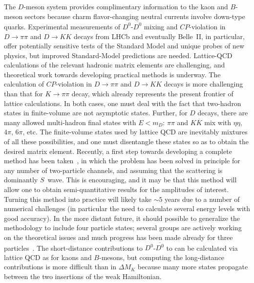 \begin{itemize}
The $D$-meson system provides complimentary information to the kaon and $B$-meson sectors because charm flavor-changing neutral currents involve down-type quarks.  Experimental measurements of $D^0$-$\overline{D^0}$ mixing and $CP$-violation in $D\to\pi\pi$ and $D\to KK$ decays from LHCb and eventually Belle~II, in particular, offer potentially sensitive tests of the Standard Model and unique probes of new physics, but improved Standard-Model predictions are needed.  Lattice-QCD calculations of the relevant hadronic matrix elements are challenging, and theoretical work towards developing practical methods is underway.  
The calculation of $CP$-violation in $D\to\pi\pi$ and $D\to KK$ decays is more challenging than that for $K\to\pi\pi$ decay, which already represents the present frontier of lattice calculations.  In both cases, one must deal with the fact that two-hadron
states in finite-volume are not asymptotic states.
Further, for $D$ decays, there are many allowed multi-hadron final states with $E< m_D$: $\pi\pi$ and
$K\overline{K}$ mix with $\eta\eta$, $4\pi$, $6\pi$, etc.
The finite-volume states used by lattice QCD are 
inevitably mixtures of all these possibilities, and one
must disentangle
these states so as to obtain the desired matrix element.
Recently, a first step towards 
developing a complete method has been taken~\cite{Hansen:2012tf}, in which the
problem has been solved in principle for any number of two-particle
channels, and assuming that the scattering is dominantly $S$~wave.
This is encouraging, and it may be that this method will allow
one to  obtain semi-quantitative results for the amplitudes
of interest. Turning this method into
practice will likely take $\sim 5$ years due to a number of numerical
challenges (in particular the need to calculate several
energy levels with good accuracy).  In the more distant future, it should possible to generalize the
methodology to include four particle states; several groups
are actively working on the theoretical issues and much progress
has been made already for three particles~\cite{Polejaeva:2012ut,Briceno:2012rv,Guo:2013qla}.
The short-distance contributions to $D^0$-$\overline{D^0}$ to can be calculated via lattice QCD as for kaons and $B$-mesons, but computing the long-distance contributions is more difficult than in $\Delta M_K$ because many more states propagate between the two insertions of the weak Hamiltonian.


\end{itemize}
